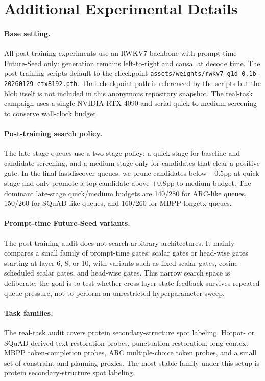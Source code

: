 \section{Additional Experimental Details}
\paragraph{Base setting.}
All post-training experiments use an RWKV7 backbone with prompt-time Future-Seed only: generation remains left-to-right and causal at decode time. The post-training scripts default to the checkpoint \texttt{assets/weights/rwkv7-g1d-0.1b-20260129-ctx8192.pth}. That checkpoint path is referenced by the scripts but the blob itself is not included in this anonymous repository snapshot. The real-task campaign uses a single NVIDIA RTX 4090 and serial quick-to-medium screening to conserve wall-clock budget.

\paragraph{Post-training search policy.}
The late-stage queues use a two-stage policy: a quick stage for baseline and candidate screening, and a medium stage only for candidates that clear a positive gate. In the final fastdiscover queues, we prune candidates below $-0.5$pp at quick stage and only promote a top candidate above $+0.8$pp to medium budget. The dominant late-stage quick/medium budgets are 140/280 for ARC-like queues, 150/260 for SQuAD-like queues, and 160/260 for MBPP-longctx queues.

\paragraph{Prompt-time Future-Seed variants.}
The post-training audit does not search arbitrary architectures. It mainly compares a small family of prompt-time gates: scalar gates or head-wise gates starting at layer 6, 8, or 10, with variants such as fixed scalar gates, cosine-scheduled scalar gates, and head-wise gates. This narrow search space is deliberate: the goal is to test whether cross-layer state feedback survives repeated queue pressure, not to perform an unrestricted hyperparameter sweep.

\paragraph{Task families.}
The real-task audit covers protein secondary-structure spot labeling, Hotpot- or SQuAD-derived text restoration probes, punctuation restoration, long-context MBPP token-completion probes, ARC multiple-choice token probes, and a small set of constraint and planning proxies. The most stable family under this setup is protein secondary-structure spot labeling.

